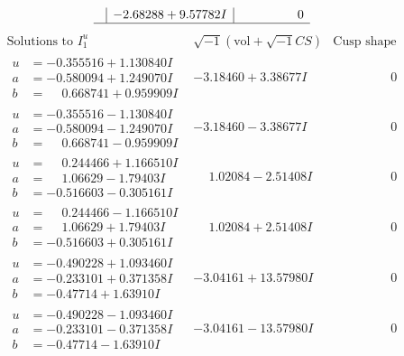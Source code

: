 \documentclass[1p]{elsarticle_modified}
\theoremstyle{definition}
\newcommand{\I}{\sqrt{-1}}
\begin{document}
$$\begin{array}{c|c|c}
 & -2.68288 + 9.57782 I & \phantom{-0.000000 } 0\\
 \hline 
 \end{array}$$\newpage$$\begin{array}{c|c|c}  
\text{Solutions to }I^u_{1}& \I (\text{vol} + \sqrt{-1}CS) & \text{Cusp shape}\\
 \hline 
\begin{aligned}
u &= -0.355516 + 1.130840 I \\
a &= -0.580094 + 1.249070 I \\
b &= \phantom{-}0.668741 + 0.959909 I\end{aligned}
 & -3.18460 + 3.38677 I & \phantom{-0.000000 } 0 \\ \hline\begin{aligned}
u &= -0.355516 - 1.130840 I \\
a &= -0.580094 - 1.249070 I \\
b &= \phantom{-}0.668741 - 0.959909 I\end{aligned}
 & -3.18460 - 3.38677 I & \phantom{-0.000000 } 0 \\ \hline\begin{aligned}
u &= \phantom{-}0.244466 + 1.166510 I \\
a &= \phantom{-}1.06629 - 1.79403 I \\
b &= -0.516603 - 0.305161 I\end{aligned}
 & \phantom{-}1.02084 - 2.51408 I & \phantom{-0.000000 } 0 \\ \hline\begin{aligned}
u &= \phantom{-}0.244466 - 1.166510 I \\
a &= \phantom{-}1.06629 + 1.79403 I \\
b &= -0.516603 + 0.305161 I\end{aligned}
 & \phantom{-}1.02084 + 2.51408 I & \phantom{-0.000000 } 0 \\ \hline\begin{aligned}
u &= -0.490228 + 1.093460 I \\
a &= -0.233101 + 0.371358 I \\
b &= -0.47714 + 1.63910 I\end{aligned}
 & -3.04161 + 13.57980 I & \phantom{-0.000000 } 0 \\ \hline\begin{aligned}
u &= -0.490228 - 1.093460 I \\
a &= -0.233101 - 0.371358 I \\
b &= -0.47714 - 1.63910 I\end{aligned}
 & -3.04161 - 13.57980 I & \phantom{-0.000000 } 0 \\ \hline\begin{aligned}

\end{aligned}
\end{array}$$
\end{document}
